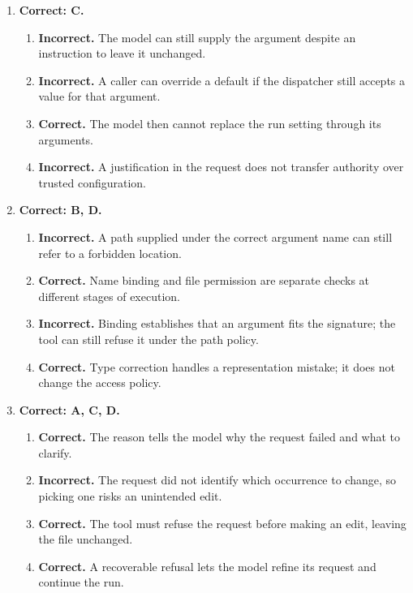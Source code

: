 \begin{enumerate}[start=31,itemsep=0.7\baselineskip]
\item[{\hyperref[exercise:34]{34.}}] \begin{minipage}[t]{\linewidth}
\textbf{Correct: C.}
\begin{enumerate}[label=\textnormal{(\Alph*)},leftmargin=*,itemsep=0pt]
\item \textbf{Incorrect.} The model can still supply the argument despite an instruction to leave it unchanged.
\item \textbf{Incorrect.} A caller can override a default if the dispatcher still accepts a value for that argument.
\item \textbf{Correct.} The model then cannot replace the run setting through its arguments.
\item \textbf{Incorrect.} A justification in the request does not transfer authority over trusted configuration.
\end{enumerate}
\end{minipage}

\item[{\hyperref[exercise:35]{35.}}] \begin{minipage}[t]{\linewidth}
\textbf{Correct: B, D.}
\begin{enumerate}[label=\textnormal{(\Alph*)},leftmargin=*,itemsep=0pt]
\item \textbf{Incorrect.} A path supplied under the correct argument name can still refer to a forbidden location.
\item \textbf{Correct.} Name binding and file permission are separate checks at different stages of execution.
\item \textbf{Incorrect.} Binding establishes that an argument fits the signature; the tool can still refuse it under the path policy.
\item \textbf{Correct.} Type correction handles a representation mistake; it does not change the access policy.
\end{enumerate}
\end{minipage}

\item[{\hyperref[exercise:36]{36.}}] \begin{minipage}[t]{\linewidth}
\textbf{Correct: A, C, D.}
\begin{enumerate}[label=\textnormal{(\Alph*)},leftmargin=*,itemsep=0pt]
\item \textbf{Correct.} The reason tells the model why the request failed and what to clarify.
\item \textbf{Incorrect.} The request did not identify which occurrence to change, so picking one risks an unintended edit.
\item \textbf{Correct.} The tool must refuse the request before making an edit, leaving the file unchanged.
\item \textbf{Correct.} A recoverable refusal lets the model refine its request and continue the run.
\end{enumerate}
\end{minipage}


\end{enumerate}
